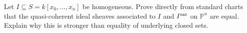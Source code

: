 \begin{problem}\label{chal:vi37-01}
Let \(I\subseteq S=k[x_0,\ldots,x_n]\) be homogeneous. Prove directly from standard charts that the quasi-coherent ideal sheaves associated to \(I\) and \(I^{\rm sat}\) on \(\mathbb P^n\) are equal. Explain why this is stronger than equality of underlying closed sets.
\end{problem}
